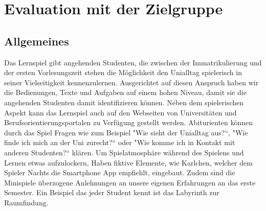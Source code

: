 \documentclass[a4paper, 11pt]{article} %
\begin{document}
\section{Evaluation mit der Zielgruppe}
\subsection{Allgemeines}
Das Lernspiel gibt angehenden Studenten, die zwischen der Immatrikulierung und der ersten Vorlesungszeit stehen die Möglichkeit den Unialltag spielerisch in seiner Vielseitigkeit kennenzulernen. Ausgerichtet auf diesen Anspruch haben wir die Bedienungen, Texte und Aufgaben auf einem hohen Niveau, damit sie die angehenden Studenten damit identifizieren können. Neben dem spielerischen Aspekt kann das Lernspiel auch auf den Webseiten von Universitäten und Berufsorientierungsportalen zu Verfügung gestellt werden. Abiturienten können durch das Spiel Fragen wie zum Beispiel "Wie sieht der Unialltag aus?“, "Wie finde ich mich an der Uni zurecht?“ oder "Wie komme ich in Kontakt mit anderen Studenten?“ klären. Um Spielatmosphäre während des Spielens und Lernen etwas aufzulockern, Haben fiktive Elemente, wie Karlchen, welcher dem Spieler Nachts die Smartphone App empfiehlt, eingebaut. Zudem sind die Minispiele überzogene Anlehnungen an unsere eigenen Erfahrungen an das erste Semester. Ein Beispiel das jeder Student kennt ist das Labyrinth zur Raumfindung. 
\end{document}
